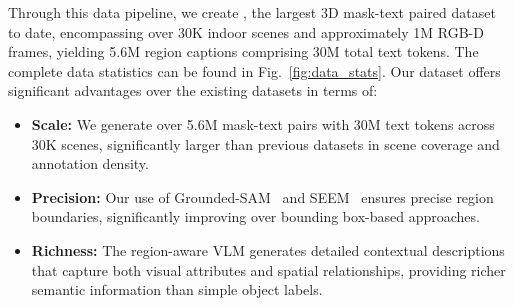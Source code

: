 Through this data pipeline, we create \dataname, the largest 3D mask-text paired dataset to date,
encompassing over 30K indoor scenes and approximately 1M RGB-D frames, yielding 5.6M region captions comprising 30M total text tokens.
The complete data statistics can be found in 
Fig.~\ref{fig:data_stats}.
Our dataset offers significant advantages over the existing datasets in terms of:
\begin{itemize}[leftmargin=*,itemsep=1pt]
    \item \textbf{Scale:} We generate over 5.6M mask-text pairs with 30M text tokens across 30K scenes, significantly larger than previous datasets in scene coverage and annotation density.
    \item \textbf{Precision:} Our use of Grounded-SAM~\cite{ren2024grounded} and SEEM~\cite{zou2024segment} ensures precise region boundaries, significantly improving over bounding box-based approaches.
    \item \textbf{Richness:} The region-aware VLM generates detailed contextual descriptions that capture both visual attributes and spatial relationships, providing richer semantic information than simple object labels.
\end{itemize}



